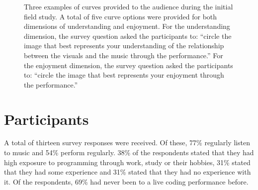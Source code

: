 \begin{figure}
\centering
{}
\hfill
{}
\hfill
{}
\caption[Exploratory field study survey dimension curves]{Three examples of curves provided to the audience during the
initial field study. A total of five curve options were provided for
both dimensions of understanding and enjoyment. For the understanding
dimension, the survey question asked the participants to: ``circle the
image that best represents your understanding of the relationship
between the visuals and the music through the performance.'' For the
enjoyment dimension, the survey question asked the participants to:
``circle the image that best represents your enjoyment through the
performance.''}
\label{fig:understanding-over-time}
\end{figure}


\section{Participants}

A total of thirteen survey responses were received. Of these, 77\% regularly listen to music and 54\% perform regularly. 38\% of the respondents stated that they had high exposure to programming through work, study or their hobbies, 31\% stated that they had some experience and 31\% stated that they had no experience with it. Of the respondents, 69\% had never been to a live coding performance before.

